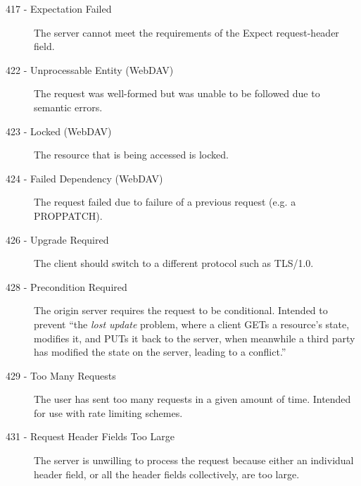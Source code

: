 \begin{description}
	\item [417 - Expectation Failed] The server cannot meet the requirements of the Expect request-header field.

	\item [422 - Unprocessable Entity (WebDAV)] The request was well-formed but was unable to be followed due to semantic errors.

	\item [423 - Locked (WebDAV)] The resource that is being accessed is locked.

	\item [424 - Failed Dependency (WebDAV)] The request failed due to failure of a previous request (e.g. a PROPPATCH).

	\item [426 - Upgrade Required] The client should switch to a different protocol such as TLS/1.0.

	\item [428 - Precondition Required] The origin server requires the request to be conditional. Intended to prevent \enquote{the \textit{lost update} problem, where a client GETs a resource's state, modifies it, and PUTs it back to the server, when meanwhile a third party has modified the state on the server, leading to a conflict.}
	
	\item [429 - Too Many Requests] The user has sent too many requests in a given amount of time. Intended for use with rate limiting schemes.

	\item [431 - Request Header Fields Too Large] The server is unwilling to process the request because either an individual header field, or all the header fields collectively, are too large.
\end{description}